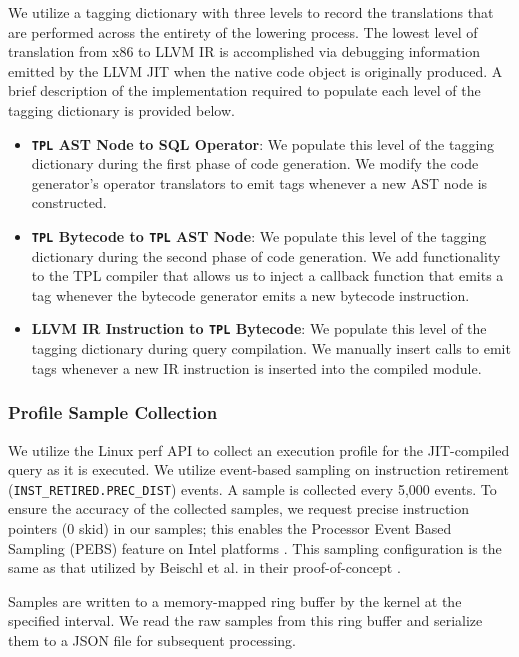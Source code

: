 \documentclass{vldb}
\newcommand{\tpl}{\texttt{TPL}\xspace}
\begin{document}
We utilize a tagging dictionary with three levels to record the translations that are performed across the entirety of the lowering process. The lowest level of translation from x86 to LLVM IR is accomplished via debugging information emitted by the LLVM JIT when the native code object is originally produced. A brief description of the implementation required to populate each level of the tagging dictionary is provided below.
\begin{itemize}
    \item \textbf{\tpl AST Node to SQL Operator}: We populate this level of the tagging dictionary during the first phase of code generation. We modify the code generator’s operator translators to emit tags whenever a new AST node is constructed.
    \item \textbf{\tpl Bytecode to \tpl AST Node}: We populate this level of the tagging dictionary during the second phase of code generation. We add functionality to the TPL compiler that allows us to inject a callback function that emits a tag whenever the bytecode generator emits a new bytecode instruction.
    \item \textbf{LLVM IR Instruction to \tpl Bytecode}: We populate this level of the tagging dictionary during query compilation. We manually insert calls to emit tags whenever a new IR instruction is inserted into the compiled module.
\end{itemize}

\subsubsection{Profile Sample Collection}

We utilize the Linux perf API to collect an execution profile for the JIT-compiled query as it is executed. We utilize event-based sampling on instruction retirement (\lstinline{INST_RETIRED.PREC_DIST}) events. A sample is collected every 5,000 events. To ensure the accuracy of the collected samples, we request precise instruction pointers (0 skid) in our samples; this enables the Processor Event Based Sampling (PEBS) feature on Intel platforms \cite{intelmanual}. This sampling configuration is the same as that utilized by Beischl et al. in their proof-of-concept \cite{beischl21}.

Samples are written to a memory-mapped ring buffer by the kernel at the specified interval. We read the raw samples from this ring buffer and serialize them to a JSON file for subsequent processing.
\end{document}
